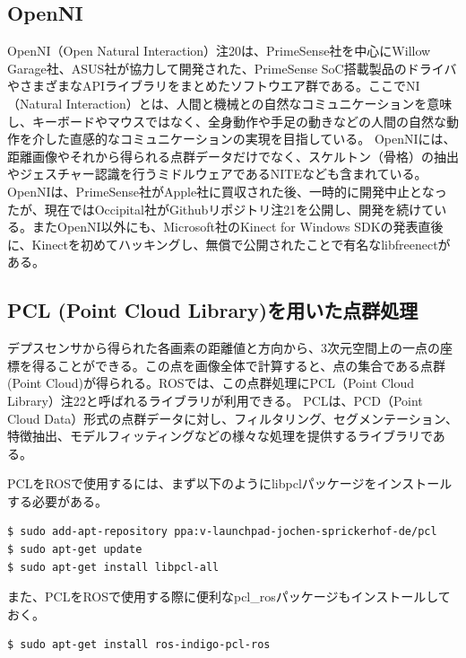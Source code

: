 \subsection{OpenNI}

OpenNI（Open Natural Interaction）注20は、PrimeSense社を中心にWillow Garage社、ASUS社が協力して開発された、PrimeSense SoC搭載製品のドライバやさまざまなAPIライブラリをまとめたソフトウエア群である。ここでNI（Natural Interaction）とは、人間と機械との自然なコミュニケーションを意味し、キーボードやマウスではなく、全身動作や手足の動きなどの人間の自然な動作を介した直感的なコミュニケーションの実現を目指している。
OpenNIには、距離画像やそれから得られる点群データだけでなく、スケルトン（骨格）の抽出やジェスチャー認識を行うミドルウェアであるNITEなども含まれている。OpenNIは、PrimeSense社がApple社に買収された後、一時的に開発中止となったが、現在ではOccipital社がGithubリポジトリ注21を公開し、開発を続けている。またOpenNI以外にも、Microsoft社のKinect for Windows SDKの発表直後に、Kinectを初めてハッキングし、無償で公開されたことで有名なlibfreenectがある。

\subsection{PCL (Point Cloud Library)を用いた点群処理}

デプスセンサから得られた各画素の距離値と方向から、3次元空間上の一点の座標を得ることができる。この点を画像全体で計算すると、点の集合である点群(Point Cloud)が得られる。ROSでは、この点群処理にPCL（Point Cloud Library）注22と呼ばれるライブラリが利用できる。
PCLは、PCD（Point Cloud Data）形式の点群データに対し、フィルタリング、セグメンテーション、特徴抽出、モデルフィッティングなどの様々な処理を提供するライブラリである。

PCLをROSで使用するには、まず以下のようにlibpclパッケージをインストールする必要がある。

\begin{lstlisting}[language=ROS]
$ sudo add-apt-repository ppa:v-launchpad-jochen-sprickerhof-de/pcl
$ sudo apt-get update
$ sudo apt-get install libpcl-all
\end{lstlisting}

また、PCLをROSで使用する際に便利なpcl\_rosパッケージもインストールしておく。

\begin{lstlisting}[language=ROS]
$ sudo apt-get install ros-indigo-pcl-ros
\end{lstlisting}

